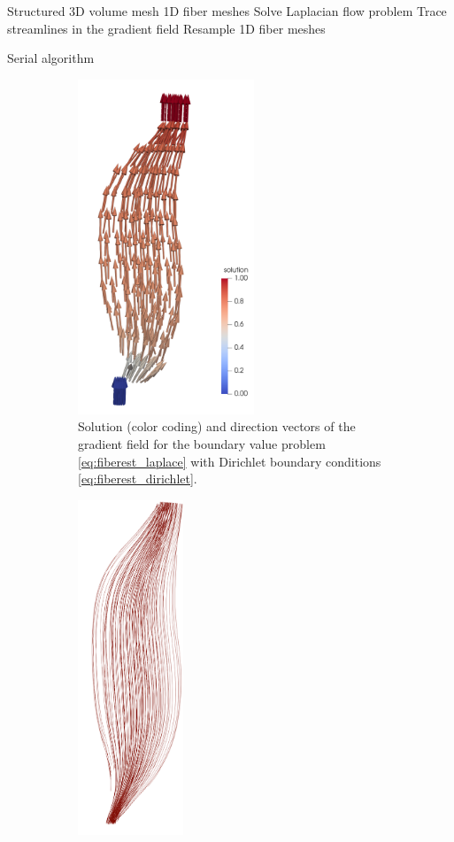 \begin{algorithm}
  \begin{algorithmic}[1]%
    \Statex{}
    \Require Structured 3D volume mesh
    \Ensure 1D fiber meshes
    \Statex
    \State Solve Laplacian flow problem   \label{line:2.2}
    \State Trace streamlines in the gradient field  \label{line:2.3}
    \State Resample 1D fiber meshes \label{line:2.4}
    \EndProcedure
  \end{algorithmic}%
  \caption{Serial algorithm}%
  \label{alg:serial_algorithm_2}%
\end{algorithm}%

\begin{figure}%
  \centering%
  \begin{subfigure}[t]{0.48\textwidth}%
    \centering%
    \includegraphics[height=10cm]{images/fiber_creation/potential_flow.png}%
    \caption{Solution (color coding) and direction vectors of the gradient field for the boundary value problem \cref{eq:fiberest_laplace} with Dirichlet boundary conditions \cref{eq:fiberest_dirichlet}.}%
    \label{fig:potential_flow}%
  \end{subfigure}
  \quad
  \begin{subfigure}[t]{0.48\textwidth}%
    \centering%
    \includegraphics[height=10cm]{images/fiber_creation/streamlines_red.png}%

\end{subfigure}
\end{figure}
